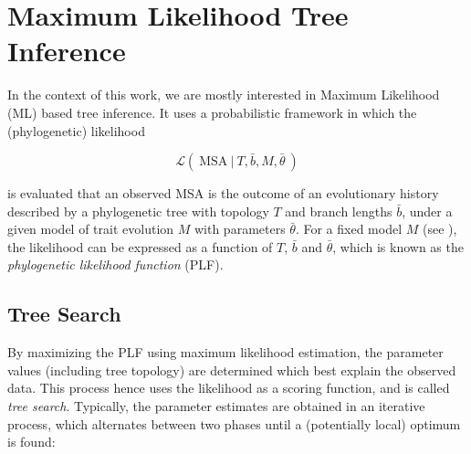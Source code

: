 
\section{Maximum Likelihood Tree Inference}
\label{ch:Foundations:sec:MLTreeInference}

In the context of this work, we are mostly interested in Maximum Likelihood (ML) based tree inference.
It uses a probabilistic framework in which the (phylogenetic) likelihood

\begin{equation}
    \label{ch:Foundations:sec:MLTreeInference:eq:likelihood}
    \mathcal{L}(~ \mbox{MSA} ~|~ T, \bar{b}, M, \bar{\theta} ~)
\end{equation}

is evaluated that an observed MSA is the outcome of an evolutionary history described by a phylogenetic tree
with topology $T$ and branch lengths $\bar{b}$, under a given model of trait evolution $M$ with parameters $\bar{\theta}$.
For a fixed model $M$ (see ),
the likelihood can be expressed as a function of $T$, $\bar{b}$ and $\bar{\theta}$,
which is known as the \emph{phylogenetic likelihood function} (PLF).


\subsection{Tree Search}
\label{ch:Foundations:sec:MLTreeInference:sub:TreeSearch}

By maximizing the PLF using maximum likelihood estimation,
the parameter values (including tree topology) are determined which best explain the observed data.
This process hence uses the likelihood as a scoring function, and is called \emph{tree search}.
Typically, the parameter estimates are obtained in an iterative process,
which alternates between two phases until a (potentially local) optimum is found:


